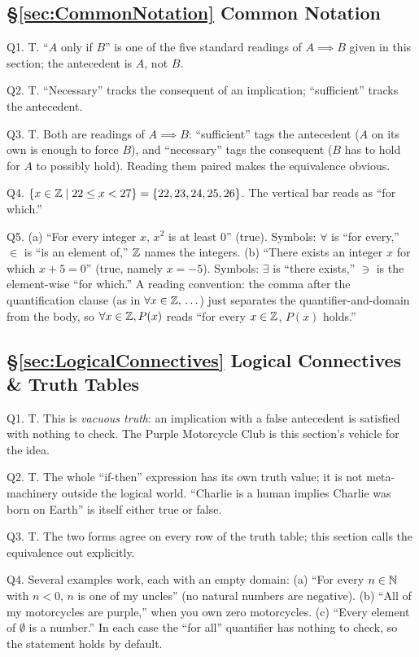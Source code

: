 \subsection*{\S\ref{sec:CommonNotation} Common Notation}
\hypertarget{a:ch0:notation}{}
\noindent Q1. T. ``$A$ only if $B$'' is one of the five standard readings of $A \implies B$ given in this section; the antecedent is $A$, not $B$.\par\smallskip
\noindent Q2. T. ``Necessary'' tracks the consequent of an implication; ``sufficient'' tracks the antecedent.\par\smallskip
\noindent Q3. T. Both are readings of $A \implies B$: ``sufficient'' tags the antecedent ($A$ on its own is enough to force $B$), and ``necessary'' tags the consequent ($B$ has to hold for $A$ to possibly hold). Reading them paired makes the equivalence obvious.\par\smallskip
\noindent Q4. $\{x \in {\mathbb{Z}} \mid 22 \leq x < 27\} = \{22, 23, 24, 25, 26\}$. The vertical bar reads as ``for which.''\par\smallskip
\noindent Q5. (a) ``For every integer $x$, $x^2$ is at least $0$'' (true). Symbols: $\forall$ is ``for every,'' $\in$ is ``is an element of,'' ${\mathbb{Z}}$ names the integers. (b) ``There exists an integer $x$ for which $x + 5 = 0$'' (true, namely $x = -5$). Symbols: $\exists$ is ``there exists,'' $\ni$ is the element-wise ``for which.'' A reading convention: the comma after the quantification clause (as in $\forall x \in {\mathbb{Z}}, \, \ldots$) just separates the quantifier-and-domain from the body, so $\forall x \in {\mathbb{Z}}, P(x)$ reads ``for every $x \in {\mathbb{Z}}$, $P(x)$ holds.''\par\smallskip
\hfill{}\par\medskip

\subsection*{\S\ref{sec:LogicalConnectives} Logical Connectives \& Truth Tables}
\hypertarget{a:ch0:truthtables}{}
\noindent Q1. T. This is \textit{vacuous truth}: an implication with a false antecedent is satisfied with nothing to check. The Purple Motorcycle Club is this section's vehicle for the idea.\par\smallskip
\noindent Q2. T. The whole ``if-then'' expression has its own truth value; it is not meta-machinery outside the logical world. ``Charlie is a human implies Charlie was born on Earth'' is itself either true or false.\par\smallskip
\noindent Q3. T. The two forms agree on every row of the truth table; this section calls the equivalence out explicitly.\par\smallskip
\noindent Q4. Several examples work, each with an empty domain: (a) ``For every $n \in {\mathbb{N}}$ with $n < 0$, $n$ is one of my uncles'' (no natural numbers are negative). (b) ``All of my motorcycles are purple,'' when you own zero motorcycles. (c) ``Every element of $\emptyset$ is a number.'' In each case the ``for all'' quantifier has nothing to check, so the statement holds by default.\par\smallskip
\hfill{}\par\medskip

